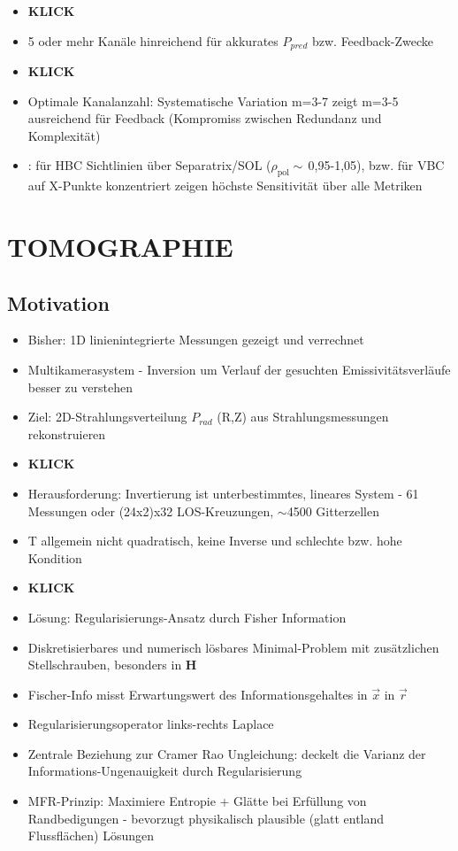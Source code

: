 \documentclass[11pt,a4paper]{article}
\begin{document}
\begin{itemize}
\item \textbf{KLICK}
\item 5 oder mehr Kanäle hinreichend für akkurates $P_{pred}$ bzw. Feedback-Zwecke
\item \textbf{KLICK}
\item Optimale Kanalanzahl: Systematische Variation m=3-7 zeigt m=3-5 ausreichend für Feedback (Kompromiss zwischen Redundanz und Komplexität)
\item : für HBC Sichtlinien über Separatrix/SOL ($\rho_{\text{pol}}\sim$\,0,95-1,05), bzw. für VBC auf X-Punkte konzentriert zeigen höchste Sensitivität über alle Metriken

\end{itemize}

\section{TOMOGRAPHIE}

\subsection{Motivation}

\begin{itemize}
\item Bisher: 1D linienintegrierte Messungen gezeigt und verrechnet
\item Multikamerasystem - Inversion um Verlauf der gesuchten Emissivitätsverläufe besser zu verstehen
\item Ziel: 2D-Strahlungsverteilung $P_{rad}$ (R,Z) aus Strahlungsmessungen rekonstruieren
\item \textbf{KLICK}
\item Herausforderung: Invertierung ist unterbestimmtes, lineares System - 61 Messungen oder (24x2)x32 LOS-Kreuzungen, $\sim$4500 Gitterzellen
\item T allgemein nicht quadratisch, keine Inverse und schlechte bzw. hohe Kondition
\item \textbf{KLICK}
\item Lösung: Regularisierungs-Ansatz durch Fisher Information
\item Diskretisierbares und numerisch lösbares Minimal-Problem mit zusätzlichen Stellschrauben, besonders in $\mathbf{H}$
\item Fischer-Info misst Erwartungswert des Informationsgehaltes in $\vec{x}$ in $\vec{r}$
\item Regularisierungsoperator links-rechts Laplace
\item Zentrale Beziehung zur Cramer Rao Ungleichung: deckelt die Varianz der Informations-Ungenauigkeit durch Regularisierung
\item MFR-Prinzip: Maximiere Entropie + Glätte bei Erfüllung von Randbedigungen - bevorzugt physikalisch plausible (glatt entland Flussflächen) Lösungen
\end{itemize}
\end{document}
